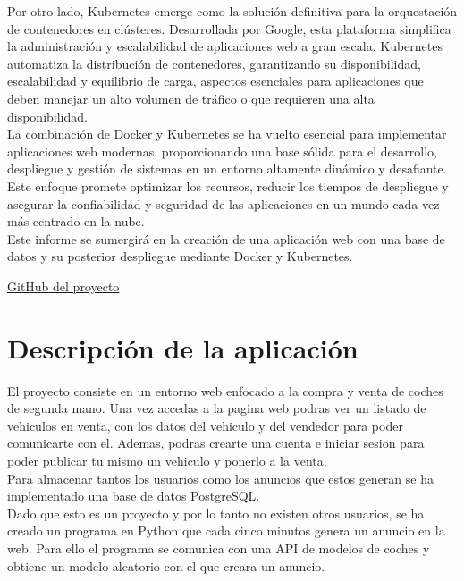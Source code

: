 \documentclass{report}
\begin{document}
        Por otro lado, Kubernetes emerge como la solución definitiva para la orquestación de contenedores en clústeres. Desarrollada por Google, esta plataforma simplifica la administración y escalabilidad de aplicaciones web a gran escala. Kubernetes automatiza la distribución de contenedores, garantizando su disponibilidad, escalabilidad y equilibrio de carga, aspectos esenciales para aplicaciones que deben manejar un alto volumen de tráfico o que requieren una alta disponibilidad.\\
        
        La combinación de Docker y Kubernetes se ha vuelto esencial para implementar aplicaciones web modernas, proporcionando una base sólida para el desarrollo, despliegue y gestión de sistemas en un entorno altamente dinámico y desafiante. Este enfoque promete optimizar los recursos, reducir los tiempos de despliegue y asegurar la confiabilidad y seguridad de las aplicaciones en un mundo cada vez más centrado en la nube.\\
        
        Este informe se sumergirá en la creación de una aplicación web con una base de datos y su posterior despliegue mediante Docker y Kubernetes.

        \vfill
        \begin{center}
            \textcolor{Cyan}{\href{https://github.com/Xabierland/AS-Proyecto}{GitHub del proyecto}}
        \end{center}
    \chapter{Descripción de la aplicación}
        El proyecto consiste en un entorno web enfocado a la compra y venta de coches de segunda mano.
        Una vez accedas a la pagina web podras ver un listado de vehiculos en venta, con los datos del vehiculo y del vendedor para poder comunicarte con el.
        Ademas, podras crearte una cuenta e iniciar sesion para poder publicar tu mismo un vehiculo y ponerlo a la venta.\\

        Para almacenar tantos los usuarios como los anuncios que estos generan se ha implementado una base de datos PostgreSQL.\\

        Dado que esto es un proyecto y por lo tanto no existen otros usuarios, se ha creado un programa en Python que cada cinco minutos genera un anuncio en la web.
        Para ello el programa se comunica con una API de modelos de coches y obtiene un modelo aleatorio con el que creara un anuncio.\\
\end{document}
